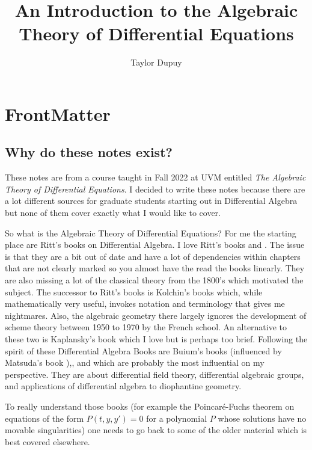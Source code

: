 \documentclass[12pt]{book}
\title{An Introduction to the Algebraic Theory of Differential Equations}
\author{Taylor Dupuy }
\numberwithin{equation}{section}
\theoremstyle{definition}
\theoremstyle{remark}
\begin{document}
\maketitle

\frontmatter

\tableofcontents

\chapter{FrontMatter}

\section{Why do these notes exist?}
These notes are from a course taught in Fall 2022 at UVM entitled \emph{The Algebraic Theory of Differential Equations}. 
I decided to write these notes because there are a lot different sources for graduate students starting out in Differential Algebra but none of them cover exactly what I would like to cover. 

So what is the Algebraic Theory of Differential Equations? 
For me the starting place are Ritt's books on Differential Algebra. 
I love Ritt's books \cite{Ritt1932} and \cite{Ritt1950}. 
The issue is that they are a bit out of date and have a lot of dependencies within chapters that are not clearly marked so you almost have the read the books linearly. 
They are also missing a lot of the classical theory from the 1800's which motivated the subject. 
The successor to Ritt's books is Kolchin's books \cite{Kolchin1973} which, while mathematically very useful, invokes notation and terminology that gives me nightmares. 
Also, the algebraic geometry there largely ignores the development of scheme theory between 1950 to 1970 by the French school. 
An alternative to these two is Kaplansky's book \cite{Kaplansky1976} which I love but is perhaps too brief. 
Following the spirit of these Differential Algebra Books are Buium's books \cite{Buium1986} (influenced by Matsuda's book \cite{Matsuda1980}),\cite{Buium1992}, and \cite{Buium1994} which are probably the most influential on my perspective. 
They are about differential field theory, differential algebraic groups, and applications of differential algebra to diophantine geometry.

To really understand those books (for example the Poincar\'e-Fuchs theorem on equations of the form $P(t,y,y')=0$ for a polynomial $P$ whose solutions have no movable singularities) one needs to go back to some of the older material which is best covered elsewhere. 
\end{document}
